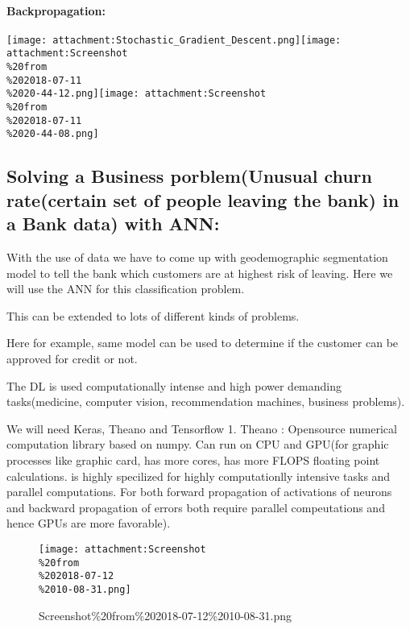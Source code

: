 \documentclass[11pt]{article}
\makeatletter
\def\maxwidth{\ifdim\Gin@nat@width>\linewidth\linewidth
    \else\Gin@nat@width\fi}
\let\Oldincludegraphics\includegraphics
\renewcommand{\includegraphics}[1]{\Oldincludegraphics[width=.8\maxwidth]{#1}}
\makeatother
\begin{document}
\hypertarget{backpropagation}{%
\paragraph{Backpropagation:}\label{backpropagation}}

\texttt{[image: attachment:Stochastic\_Gradient\_Descent.png]}\texttt{[image: attachment:Screenshot\\\%20from\\\%202018-07-11\\\%2020-44-12.png]}\texttt{[image: attachment:Screenshot\\\%20from\\\%202018-07-11\\\%2020-44-08.png]}

    \hypertarget{solving-a-business-porblemunusual-churn-ratecertain-set-of-people-leaving-the-bank-in-a-bank-data-with-ann}{%
\subsection{Solving a Business porblem(Unusual churn rate(certain set of
people leaving the bank) in a Bank data) with
ANN:}\label{solving-a-business-porblemunusual-churn-ratecertain-set-of-people-leaving-the-bank-in-a-bank-data-with-ann}}

With the use of data we have to come up with geodemographic segmentation
model to tell the bank which customers are at highest risk of leaving.
Here we will use the ANN for this classification problem.

This can be extended to lots of different kinds of problems.

Here for example, same model can be used to determine if the customer
can be approved for credit or not.

The DL is used computationally intense and high power demanding
tasks(medicine, computer vision, recommendation machines, business
problems).

We will need Keras, Theano and Tensorflow 1. Theano : Opensource
numerical computation library based on numpy. Can run on CPU and GPU(for
graphic processes like graphic card, has more cores, has more FLOPS
floating point calculations. is highly specilized for highly
computationlly intensive tasks and parallel computations. For both
forward propagation of activations of neurons and backward propagation
of errors both require parallel compeutations and hence GPUs are more
favorable).

\begin{figure}
\centering
\texttt{[image: attachment:Screenshot\\\%20from\\\%202018-07-12\\\%2010-08-31.png]}
\caption{Screenshot\%20from\%202018-07-12\%2010-08-31.png}
\end{figure}
\end{document}

